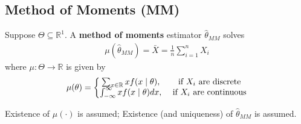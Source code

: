 \documentclass[11pt]{elegantbook}
\begin{document}
\subsection{Method of Moments (MM)}
\begin{definition}
    \normalfont
    Suppose $\Theta\subseteq \mathbb{R}^1$. A \textbf{method of moments} estimator $\hat{\theta}_{MM}$ solves
    \begin{equation}
        \begin{aligned}
            \mu(\hat{\theta}_{MM})=\bar{X}=\frac{1}{n}\sum_{i=1}^n X_i
        \end{aligned}
        \nonumber
    \end{equation}
    where $\mu: \Theta \rightarrow \mathbb{R}$ is given by
    \begin{equation}
        \begin{aligned}
            \mu(\theta)=\left\{\begin{matrix}
                \sum_{x\in \mathbb{R}}x f(x\mid \theta),& \textnormal{ if $X_i$ are discrete}\\
                \int_{-\infty}^\infty x f(x\mid \theta) dx,& \textnormal{ if $X_i$ are continuous}
            \end{matrix}\right.
        \end{aligned}
        \nonumber
    \end{equation}
\end{definition}
\begin{remark}
    Existence of $\mu(\cdot)$ is assumed;
    Existence (and uniqueness) of $\hat{\theta}_{MM}$ is assumed.
\end{remark}
\end{document}

